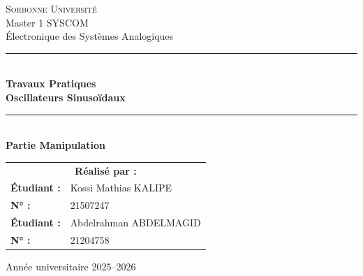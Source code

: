 \documentclass[11pt,a4paper]{report}
\newcommand{\HRule}{\rule{\linewidth}{0.5mm}}
\begin{document}
\begin{titlepage}
    \centering
    \vspace*{1cm}
    
    
    {\Large \textsc{Sorbonne Université}}\\[0.5cm]
    {\large Master 1 SYSCOM}\\[0.3cm]
    {\large Électronique des Systèmes Analogiques}\\[2cm]
    
    \HRule \\[0.6cm]
    {\Huge \textbf{Travaux Pratiques}}\\[0.4cm]
    {\huge \textbf{Oscillateurs Sinusoïdaux}}\\[0.4cm]
    \HRule \\[1.5cm]
    
    {\Large \textbf{Partie Manipulation}}\\[2.5cm]
    
    \begin{tabular}{ll}
        \multicolumn{2}{c}{\textbf{\large Réalisé par :}} \\[0.5cm]
        \textbf{Étudiant :} & Kossi Mathias KALIPE \\
        \textbf{N° :} & 21507247 \\[0.5cm]
        \textbf{Étudiant :} & Abdelrahman ABDELMAGID \\
        \textbf{N° :} & 21204758 \\
    \end{tabular}
    
    \vfill
    
    {\large Année universitaire 2025--2026}\\[0.3cm]
    
\end{titlepage}

\begin{abstract}
Ce document présente la partie expérimentale du TP sur les oscillateurs sinusoïdaux :
oscillateur à pont de Wien (avec stabilisation d'amplitude par FET) et oscillateur
à déphasage RC. Les mesures réalisées en laboratoire (fréquences, amplitudes, gains
et comportement lors de variations de paramètres) sont consignées et comparées aux
prédictions théoriques. Des captures d'oscilloscope sont prévues pour
illustrer les formes d'onde et le démarrage des oscillations.
\end{abstract}

\tableofcontents
\thispagestyle{empty}
\clearpage
\end{document}
